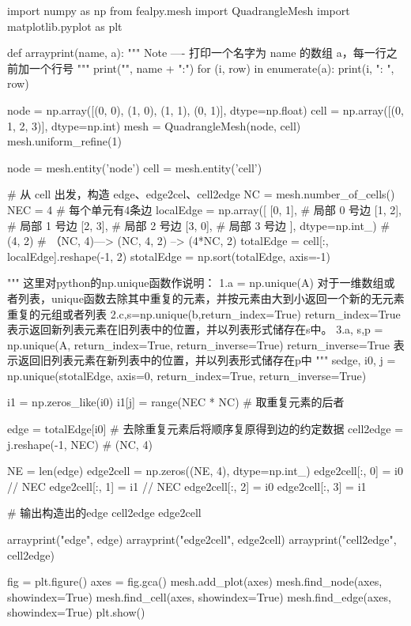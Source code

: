 \documentclass{article}
\begin{document}
\begin{python}
import numpy as np
from fealpy.mesh import QuadrangleMesh
import matplotlib.pyplot as plt


def arrayprint(name, a):
    """
    Note
    ----
    打印一个名字为 name 的数组 a，每一行之前加一个行号
    """
    print("\n", name + ":")
    for (i, row) in enumerate(a):
        print(i, ": ", row)


node = np.array([(0, 0), (1, 0), (1, 1), (0, 1)], dtype=np.float)
cell = np.array([(0, 1, 2, 3)], dtype=np.int)
mesh = QuadrangleMesh(node, cell)
mesh.uniform_refine(1)

node = mesh.entity('node')
cell = mesh.entity('cell')

# 从 cell 出发，构造 edge、edge2cel、cell2edge
NC = mesh.number_of_cells()
NEC = 4  # 每个单元有4条边
localEdge = np.array([
    [0, 1],  # 局部 0 号边
    [1, 2],  # 局部 1 号边
    [2, 3],  # 局部 2 号边
    [3, 0],  # 局部 3 号边
], dtype=np.int_)  # (4, 2)
# （NC, 4)---> (NC, 4, 2) --> (4*NC, 2)
totalEdge = cell[:, localEdge].reshape(-1, 2)
stotalEdge = np.sort(totalEdge, axis=-1)

"""
这里对python的np.unique函数作说明：
1.a = np.unique(A)
对于一维数组或者列表，unique函数去除其中重复的元素，并按元素由大到小返回一个新的无元素重复的元组或者列表
2.c,s=np.unique(b,return_index=True)
return_index=True表示返回新列表元素在旧列表中的位置，并以列表形式储存在s中。
3.a, s,p = np.unique(A, return_index=True, return_inverse=True)
return_inverse=True 表示返回旧列表元素在新列表中的位置，并以列表形式储存在p中
"""
sedge, i0, j = np.unique(stotalEdge,
                         axis=0,
                         return_index=True,
                         return_inverse=True)

i1 = np.zeros_like(i0)
i1[j] = range(NEC * NC)  # 取重复元素的后者

edge = totalEdge[i0]  # 去除重复元素后将顺序复原得到边的约定数据
cell2edge = j.reshape(-1, NEC)  # (NC, 4)

NE = len(edge)
edge2cell = np.zeros((NE, 4), dtype=np.int_)
edge2cell[:, 0] = i0 // NEC
edge2cell[:, 1] = i1 // NEC
edge2cell[:, 2] = i0 %
edge2cell[:, 3] = i1 %

# 输出构造出的edge cell2edge edge2cell

arrayprint("edge", edge)
arrayprint("edge2cell", edge2cell)
arrayprint("cell2edge", cell2edge)

fig = plt.figure()
axes = fig.gca()
mesh.add_plot(axes)
mesh.find_node(axes, showindex=True)
mesh.find_cell(axes, showindex=True)
mesh.find_edge(axes, showindex=True)
plt.show()
\end{python}
\end{document}
